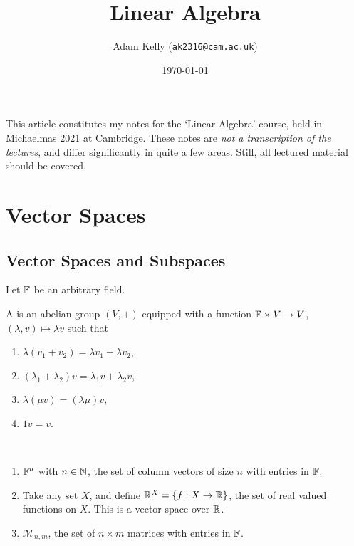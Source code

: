 \documentclass[a4paper]{scrartcl}
\title{Linear Algebra}
\author{Adam Kelly (\texttt{ak2316@cam.ac.uk})}
\date{\today}
\begin{document}
\maketitle


This article constitutes my notes for the `Linear Algebra' course, held in Michaelmas 2021 at Cambridge. These notes are \emph{not a transcription of the lectures}, and differ significantly in quite a few areas. Still, all lectured material should be covered.



\tableofcontents

\section{Vector Spaces}

\subsection{Vector Spaces and Subspaces}

Let $\mathbb{F}$ be an arbitrary field.

\begin{definition}
    A  is an abelian group $(V, +)$ equipped with a function $\mathbb{F} \times V \rightarrow V$, $(\lambda, v) \mapsto \lambda v$ such that 
    \begin{enumerate}[label=(\roman*)]
        \item $\lambda(v_1 + v_2) = \lambda v_1 + \lambda v_2$,
        \item $(\lambda_1 + \lambda_2)v = \lambda_1 v + \lambda_2 v$,
        \item $\lambda(\mu v) = (\lambda \mu) v$,
        \item $1v = v$.
    \end{enumerate} 
\end{definition}

\begin{example}~
    \vspace{-1.5\baselineskip}
    \begin{enumerate}[label=(\roman*)]
        \item $\mathbb{F}^n$ with $n \in \mathbb{N}$, the set of column vectors of size $n$ with entries in $\mathbb{F}$.
        \item Take any set $X$, and define $\mathbb{R}^X = \{f: X \rightarrow \mathbb{R}\}$, the set of real valued functions on $X$. This is a vector space over $\mathbb{R}$.
        \item $\mathcal{M}_{n, m}$, the set of $n \times m$ matrices with entries in $\mathbb{F}$.
    \end{enumerate}
\end{example}
\end{document}
